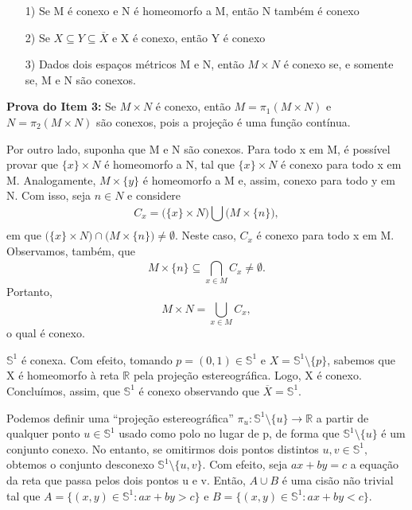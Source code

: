 \documentclass[metric_notes.tex]{subfiles}
\begin{document}
\begin{crl*}
	\begin{itemize}
		\item[1)] Se M é conexo e N é homeomorfo a M, então N também é conexo
		\item[2)] Se \(X\subseteq{Y}\subseteq{\overline{X}}\) e X é conexo, então Y é conexo
		\item[3)] Dados dois espaços métricos M e N, então \(M\times N\) é conexo se, e somente se,
		      M e N são conexos.
	\end{itemize}
\end{crl*}
\begin{proof*}
	\textbf{Prova do Item 3:} Se \(M\times N\) é conexo, então \(M = \pi_{1}(M\times N)\) e \(N = \pi_{2}(M\times N)\) são conexos, pois
	a projeção é uma função contínua.

	Por outro lado, suponha que M e N são conexos. Para todo x em M, é possível provar
	que \(\{x\}\times N\) é homeomorfo a N, tal que \(\{x\}\times N\) é conexo para todo x em M. Analogamente, \(M\times\{y\}\) é
	homeomorfo a M e, assim, conexo para todo y em N. Com isso, seja \(n\in N\) e considere
	\[
		C_{x} = \biggl(\{x\}\times N\biggr)\bigcup_{}^{}{\biggl(M\times \{n\}\biggr)},
	\]
	em que \(\biggl(\{x\}\times N\biggr)\cap \biggl(M\times \{n\}\biggr)\neq\emptyset.\) Neste caso, \(C_{x}\) é conexo para todo
	x em M. Observamos, também, que
	\[
		M\times \{n\}\subseteq{\bigcap_{x\in M}^{}{C_{x}}}\neq\emptyset.
	\]
	Portanto,
	\[
		M\times N = \bigcup_{x\in M}^{}{C_{x}},
	\]
	o qual é conexo.\qedsymbol
\end{proof*}
\begin{example}
	\(\mathbb{S}^{1}\) é conexa. Com efeito, tomando \(p = (0, 1)\in \mathbb{S}^{1}\) e \(X = \mathbb{S}^{1}\setminus\{p\}\), sabemos que X é homeomorfo
	à reta \(\mathbb{R}\) pela projeção estereográfica. Logo, X é conexo. Concluímos, assim, que \(\mathbb{S}^{1}\) é conexo observando que
	\(\overline{X} = \mathbb{S}^{1}.\)
\end{example}
\begin{example}
	Podemos definir uma ``projeção estereográfica'' \(\pi_{u}:\mathbb{S}^{1}\setminus\{u\}\rightarrow \mathbb{R}\) a partir de qualquer ponto
	\(u\in \mathbb{S}^{1}\) usado como polo no lugar de p, de forma que \(\mathbb{S}^{1}\setminus\{u\}\) é um conjunto conexo. No entanto, se omitirmos dois pontos distintos \(u, v\in \mathbb{S}^{1},\) obtemos o conjunto
	desconexo \(\mathbb{S}^{1}\setminus\{u, v\}\). Com efeito, seja \(ax + by = c\) a equação da reta que passa
	pelos dois pontos u e v. Então, \(A\cup B\) é uma cisão não trivial tal que \(A = \{(x, y)\in \mathbb{S}^{1}: ax + by > c\}\) e
	\(B = \{(x, y)\in \mathbb{S}^{1}: ax + by < c\}\).
\end{example}
\end{document}

